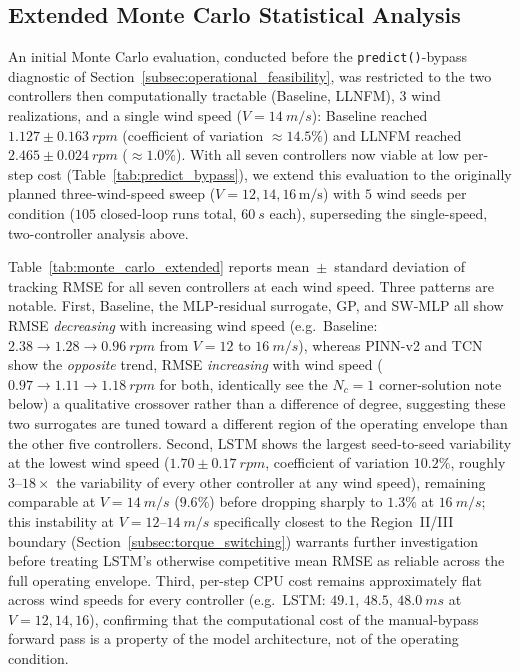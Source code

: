 \subsection{Extended Monte Carlo Statistical Analysis}
\label{subsec:monte_carlo}

An initial Monte Carlo evaluation, conducted before the
\texttt{predict()}-bypass diagnostic of
Section~\ref{subsec:operational_feasibility}, was restricted to the two
controllers then computationally tractable (Baseline, LLNFM), $3$ wind
realizations, and a single wind speed ($V=\SI{14}{m/s}$): Baseline
reached $1.127\pm\SI{0.163}{rpm}$ (coefficient of variation
$\approx14.5\%$) and LLNFM reached $2.465\pm\SI{0.024}{rpm}$
($\approx1.0\%$). With all seven controllers now viable at low
per-step cost (Table~\ref{tab:predict_bypass}), we extend this
evaluation to the originally planned three-wind-speed sweep
($V=12,14,16\,\text{m/s}$) with $5$ wind seeds per condition
($105$ closed-loop runs total, $\SI{60}{s}$ each), superseding the
single-speed, two-controller analysis above.

Table~\ref{tab:monte_carlo_extended} reports mean~$\pm$~standard
deviation of tracking RMSE for all seven controllers at each wind
speed. Three patterns are notable. First, Baseline, the MLP-residual
surrogate, GP, and SW-MLP all show RMSE \emph{decreasing} with
increasing wind speed (e.g.\ Baseline: $2.38\rightarrow1.28\rightarrow
\SI{0.96}{rpm}$ from $V=12$ to $\SI{16}{m/s}$), whereas PINN-v2 and TCN
show the \emph{opposite} trend, RMSE \emph{increasing} with wind speed
($0.97\rightarrow1.11\rightarrow\SI{1.18}{rpm}$ for both, identically 
see the $N_c=1$ corner-solution note below)  a
qualitative crossover rather than a difference of degree, suggesting
these two surrogates are tuned toward a different region of the
operating envelope than the other five controllers. Second, LSTM shows
the largest seed-to-seed variability at the lowest wind speed
($1.70\pm\SI{0.17}{rpm}$, coefficient of variation $10.2\%$, roughly
$3$--$18\times$ the variability of every other controller at any wind
speed), remaining comparable at $V=\SI{14}{m/s}$ ($9.6\%$) before dropping
sharply to $1.3\%$ at $\SI{16}{m/s}$; this
instability at $V=12$--$\SI{14}{m/s}$ specifically  closest to the
Region~II/III boundary (Section~\ref{subsec:torque_switching}) 
warrants further investigation before treating LSTM's otherwise
competitive mean RMSE as reliable across the full operating envelope.
Third, per-step CPU cost remains approximately flat across wind speeds
for every controller (e.g.\ LSTM: $49.1$, $48.5$, $\SI{48.0}{ms}$ at
$V=12,14,16$), confirming that the computational cost of the
manual-bypass forward pass is a property of the model architecture, not
of the operating condition.

